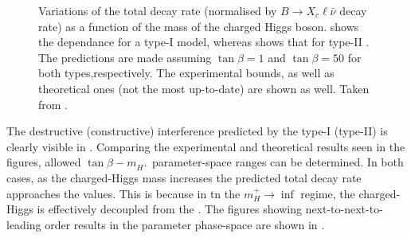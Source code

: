 \begin{figure}[htbp!]
    \centering
    \caption{\label{fig:xsgamma_br_2hdm} 
    Variations of the \BtoXsgamma total decay rate (normalised by $B\rightarrow X_c \ell\bar{\nu}$ decay rate) as a function of the mass of the charged Higgs boson.
     shows the dependance for a type-I \TwoHDM model, whereas  shows that for type-II \TwoHDM.
    The predictions are made assuming $\tan\beta=1$ and $\tan\beta=50$ for both types,respectively.
    The experimental bounds, as well as theoretical ones (not the most up-to-date) are shown as well.
    Taken from \cite{Misiak:2017bgg}.}
\end{figure}


The destructive (constructive) interference predicted by the type-I (type-II)  is clearly visible in .
Comparing the experimental and theoretical results seen in the figures, allowed $\tan\beta-m_{H^+}$ parameter-space ranges can be determined.
In both cases, as the charged-Higgs mass increases the predicted total decay rate approaches the \SM values.
This is because in tn the $m_H^+\rightarrow\inf$ regime, the charged-Higgs is effectively decoupled from the \SM.
The figures showing next-to-next-to-leading order results in the parameter phase-space are shown in .

